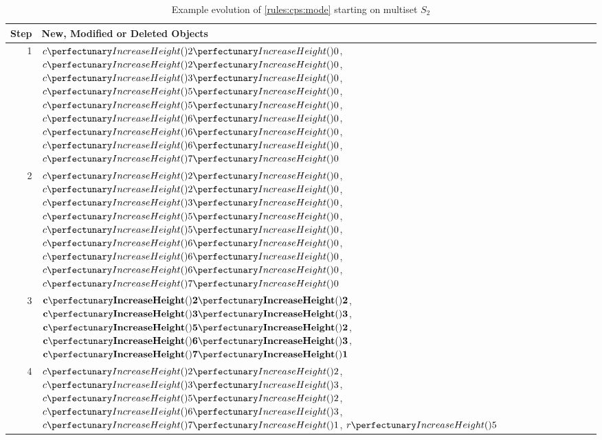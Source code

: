     
    

\begin{table} \centering
   \begin{tabular}{|r|l|}
    \hline
    \textbf{Step} & \textbf{New, Modified or Deleted Objects} \\ \hline
    1 & \(\cpfuncn{c}{2}{0}\), \(\cpfuncn{c}{2}{0}\), \(\cpfuncn{c}{3}{0}\), \(\cpfuncn{c}{5}{0}\), \(\cpfuncn{c}{5}{0}\), \(\cpfuncn{c}{6}{0}\), \(\cpfuncn{c}{6}{0}\), \(\cpfuncn{c}{6}{0}\), \(\cpfuncn{c}{7}{0}\)\\ \hline
    
    2 & \(\cpfuncn{c}{2}{0}\), \sout{\(\cpfuncn{c}{2}{0}\)}, \(\cpfuncn{c}{3}{0}\), \(\cpfuncn{c}{5}{0}\), \sout{\(\cpfuncn{c}{5}{0}\)}, \(\cpfuncn{c}{6}{0}\), \sout{\(\cpfuncn{c}{6}{0}\)}, \sout{\(\cpfuncn{c}{6}{0}\)}, \(\cpfuncn{c}{7}{0}\)\\ \hline
    
    3 & \(\mathbf{\cpfuncn{c}{2}{2}}\), \(\mathbf{\cpfuncn{c}{3}{3}}\), \(\mathbf{\cpfuncn{c}{5}{2}}\), \(\mathbf{\cpfuncn{c}{6}{3}}\), \(\mathbf{\cpfuncn{c}{7}{1}}\)\\ \hline
    
    4 & \(\cpfuncn{c}{2}{2}\), \(\cpfuncn{c}{3}{3}\), \(\cpfuncn{c}{5}{2}\), \(\cpfuncn{c}{6}{3}\), \(\cpfuncn{c}{7}{1}\), \(\cpfunc{r}{5}\)\\ \hline
    
\end{tabular}
\caption[Example evolution of \cref{rules:cps:mode}]{\label{tab:cps:mode}Example evolution of \cref{rules:cps:mode} starting on multiset \(S_2\)}
\end{table}

